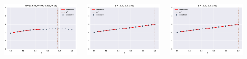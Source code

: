 \documentclass[usenames,dvipsnames,t]{beamer}
\begin{document}
\begin{columns}
\begin{column}{.2\linewidth}
    \end{column}
    \begin{column}{.2\linewidth}
        \includegraphics[width=\textwidth]{static/plot_three}
    \end{column}
    \begin{column}{.2\linewidth}
        \includegraphics[width=\textwidth]{static/plot_four}
    \end{column}
    \begin{column}{.2\linewidth}
        \includegraphics[width=\textwidth]{static/plot_four}
    \end{column}
\end{columns}
\end{document}
